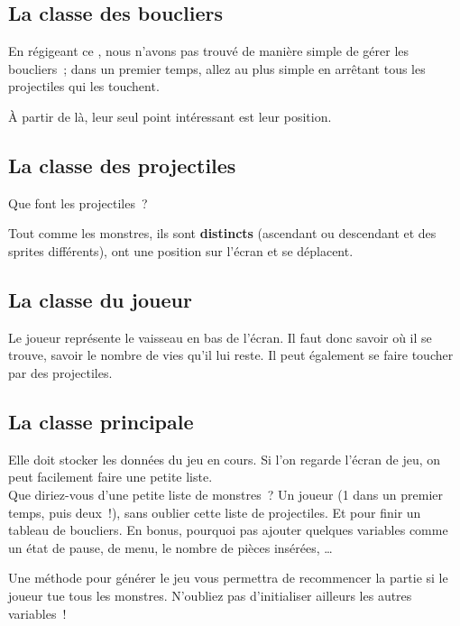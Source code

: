 \subsection{La classe des boucliers}

En régigeant ce \tp, nous n'avons pas trouvé de manière simple de gérer les boucliers~; dans un premier temps, allez au plus simple en arrêtant tous les projectiles qui les touchent.

À partir de là, leur seul point intéressant est leur position.

\subsection{La classe des projectiles}

Que font les projectiles~?

Tout comme les monstres, ils sont \textbf{distincts} (ascendant ou descendant et des sprites différents), ont une position sur l'écran et se déplacent.

\subsection{La classe du joueur}

Le joueur représente le vaisseau en bas de l'écran. Il faut donc savoir où il se trouve, savoir le nombre de vies qu'il lui reste. Il peut également se faire toucher par des projectiles.

\subsection{La classe principale}

Elle doit stocker les données du jeu en cours. Si l'on regarde l'écran de jeu, on peut facilement faire une petite liste.\\

Que diriez-vous d'une petite liste de monstres~? Un joueur (1 dans un premier temps, puis deux~!), sans oublier cette liste de projectiles. Et pour finir un tableau de boucliers. En bonus, pourquoi pas ajouter quelques variables comme un état de pause, de menu, le nombre de pièces insérées, \ldots

Une méthode pour générer le jeu vous permettra de recommencer la partie si le joueur tue tous les monstres. N'oubliez pas d'initialiser ailleurs les autres variables~!


